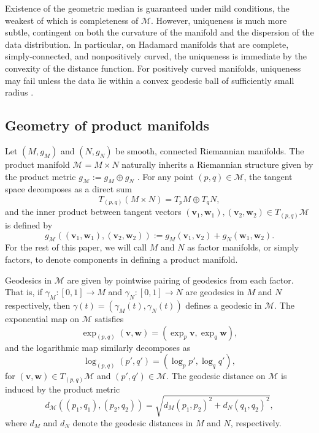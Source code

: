 \documentclass[10pt]{article}
\newcommand{\bfv}{\boldsymbol{v}}
\newcommand{\bfw}{\boldsymbol{w}}
\newcommand{\calM}{\mathcal{M}}
\begin{document}
Existence of the geometric median is guaranteed under mild conditions, the weakest of which is completeness of $\calM$. However, uniqueness is much more subtle, contingent on both the curvature of the manifold and the dispersion of the data distribution. In particular, on Hadamard manifolds that are complete, simply-connected, and nonpositively curved, the uniqueness is immediate by the convexity of the distance function. For positively curved manifolds, uniqueness may fail unless the data lie within a convex geodesic ball of sufficiently small radius \citep{bhattacharya_2012_NonparametricInferenceManifolds}.


\subsection{Geometry of product manifolds}


Let $(M,g_M)$ and $(N,g_N)$ be smooth, connected Riemannian manifolds. The product manifold $\calM = M \times N$ naturally inherits a Riemannian structure given by the product metric $g_\calM := g_M \oplus g_N$ \citep{lee_1997_RiemannianManifoldsIntroduction}. For any point $(p,q) \in \calM$, the tangent space decomposes as a direct sum
\begin{equation}\label{def:product_tangent}
	T_{(p,q)}(M\times N) = T_p M \oplus T_q N,
\end{equation}
and the inner product between tangent vectors $(\bfv_1,\bfw_1), (\bfv_2,\bfw_2) \in T_{(p,q)}\calM$ is defined by 
\begin{equation}\label{def:product_metric}
	g_\calM ((\bfv_1, \bfw_1), (\bfv_2,\bfw_2)) := g_M (\bfv_1,\bfv_2) + g_N (\bfw_1,\bfw_2).
\end{equation}
For the rest of this paper, we will call $M$ and $N$ as factor manifolds, or simply factors, to denote components in defining a product manifold.

Geodesics in $\calM$ are given by pointwise pairing of geodesics from each factor. That is, if $\gamma_M:[0,1] \to M$ and $\gamma_N:[0,1]\to N$ are geodesics in $M$ and $N$ respectively, then $\gamma(t) = (\gamma_M(t), \gamma_N(t))$ defines a geodesic in $\calM$. The exponential map on $\calM$ satisfies
\begin{equation*}
	\exp_{(p,q)}(\bfv,\bfw) = (\exp_p \bfv, \exp_q \bfw),
\end{equation*}
and the logarithmic map similarly decomposes as 
\begin{equation*}
	\log_{(p,q)}(p',q') = (\log_p p', \log_q q'),
\end{equation*}
for $(\bfv,\bfw) \in T_{(p,q)}\calM$ and $(p',q') \in \calM$. The geodesic distance on $\calM$ is induced by the product metric 
\begin{equation*}
	d_\calM((p_1,q_1), (p_2,q_2)) = \sqrt{d_M(p_1,p_2)^2 + d_N(q_1,q_2)^2},
\end{equation*}
where $d_M$ and $d_N$ denote the geodesic distances in $M$ and $N$, respectively.
\end{document}

